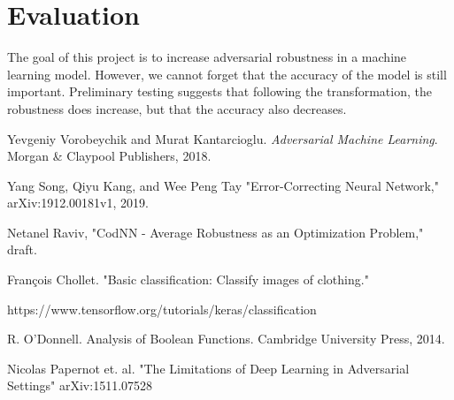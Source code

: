 \documentclass{article}
\DeclareMathOperator{\1}{\mathbb{1}}
\begin{document}
\section{Evaluation}

The goal of this project is to increase adversarial robustness in a machine learning model. However, we cannot forget that the accuracy of the model is still important. Preliminary testing suggests that following the transformation, the robustness does increase, but that the accuracy also decreases.
\begin{thebibliography}{alpha}

	Yevgeniy Vorobeychik and Murat Kantarcioglu.
	\textit{Adversarial Machine Learning}.
	Morgan \& Claypool Publishers, 2018.
	
	Yang Song, Qiyu Kang, and Wee Peng Tay
	"Error-Correcting Neural Network,"
	arXiv:1912.00181v1, 2019.
	
	Netanel Raviv,
	"CodNN - Average Robustness as an Optimization Problem,"
	draft.
	
	François Chollet. "Basic classification: Classify images of clothing."
	
	https://www.tensorflow.org/tutorials/keras/classification
	
	R. O'Donnell. Analysis of Boolean Functions. Cambridge University Press, 2014.
	
	Nicolas Papernot et. al.
	"The Limitations of Deep Learning in Adversarial Settings"
	arXiv:1511.07528
	
		
\end{thebibliography}
\end{document}
